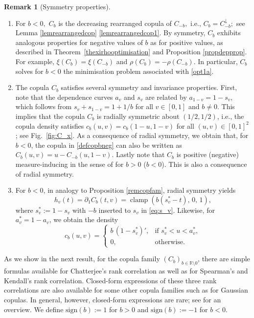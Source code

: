 \documentclass{article}
\theoremstyle{plain}
\theoremstyle{definition}
\newtheorem{remark}{Remark}
\newcommand{\R}{\mathbb{R}}
\begin{document}
\begin{remark}[Symmetry properties]\label{remsymm}
\leavevmode
    \begin{enumerate}[label=(\alph*)]
        \item \label{remsymma} For \(b<0,\) \(C_b\) is the decreasing rearranged copula of $C_{-b},$ i.e., \(C_b = C_{-b}^\downarrow;\) see Lemma \ref{lemrearrangedcop} \ref{lemrearrangedcop1}. By symmetry, \(C_b\) exhibits analogous properties for negative values of \(b\) as for positive values, as described in Theorem~\ref{thexirhooptimisation} and Proposition \ref{propdepprop}. For example, \(\xi(C_b) = \xi(C_{-b})\) and \(\rho(C_b) = - \rho(C_{-b}).\) In particular, \(C_b\) solves for \(b < 0\) the minimisation problem associated with \eqref{opt1a}.
        \item The copula \(C_b\) satisfies several symmetry and invariance properties. First, note that the dependence curves \(a_v\) and \(s_v\) are related by \(a_{1-v} = 1-s_v\), which follows from \(s_v + s_{1-v} = 1 + 1/b\) for all \(v\in [0,1]\) and \(b\ne 0\). This implies that the copula \(C_b\) is radially symmetric about \((1/2,1/2)\), i.e., the copula density satisfies \(c_b(u,v) = c_b(1-u,1-v)\) for all \((u,v)\in [0,1]^2\); see Fig.~\ref{fig:C_x}. As a consequence of radial symmetry, we obtain that, for \(b<0\), the copula in \eqref{defcopbneg} can also be written as \(C_b(u,v) = u - C_{-b}(u,1-v)\). Lastly note that \(C_b\) is positive (negative) measure-inducing in the sense of \cite{Fuchs-Tschimpke-2024} for \(b>0\) (\(b<0\)). This is also a consequence of radial symmetry.
        \item For $b<0$, in analogy to Proposition \ref{remcopfam}, radial symmetry yields
            \[
                h_v(t)=\partial_1 C_b(t,v) = \operatorname{clamp}\left(b(s^*_v-t),\,0,\,1\right),
            \]
            where $s^*_v := 1 - s_v$ with \(-b\) inserted to $s_v$ in \eqref{eq:s_v}.
            Likewise, for \(a_v^* = 1- a_v\), we obtain the density 
            \[
            c_b(u,v) = \begin{cases}
                b\,(1-s_v^*)', & \text{if } s_v^* < u < a_v^*,\\
                0, & \text{otherwise}.
            \end{cases}
            \]
    \end{enumerate}
\end{remark}

As we show in the next result, for the copula family \((C_b)_{b\in \R\setminus 0}\), there are simple formulas available for Chatterjee's rank correlation as well as for Spearman's and Kendall's rank correlation.
Closed-form expressions of these three rank correlations are also available for some other copula families such as for Gaussian copulas. In general, however, closed-form expressions are rare; see \cite[Table 6]{Ansari-Rockel-2023} for an overview.
We define $\mathrm{sign}(b) := 1$ for $b > 0$ and $\mathrm{sign}(b) := -1$ for $b < 0$.
\end{document}
